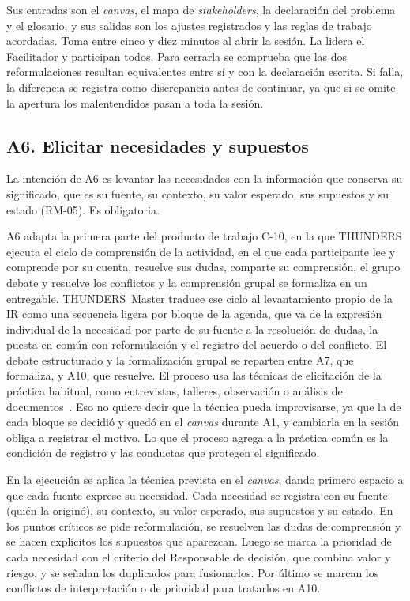 \documentclass[12pt,letterpaper,oneside]{report}
\begin{document}
Sus entradas son el \textit{canvas}, el mapa de \textit{stakeholders}, la
declaración del problema y el glosario, y sus salidas son los ajustes
registrados y las reglas de trabajo acordadas. Toma entre cinco y diez minutos al
abrir la sesión. La lidera el Facilitador y participan todos. Para cerrarla se
comprueba que las dos reformulaciones resultan equivalentes entre sí y con la
declaración escrita. Si falla, la diferencia se registra como discrepancia antes
de continuar, ya que si se omite la apertura los malentendidos pasan a toda la
sesión.

\subsection{A6. Elicitar necesidades y supuestos}
La intención de A6 es levantar las necesidades con la información que conserva
su significado, que es su fuente, su contexto, su valor esperado, sus
supuestos y su estado (RM-05). Es obligatoria.

A6 adapta la primera parte del producto de trabajo C-10, en la que THUNDERS ejecuta el
ciclo de comprensión de la actividad, en el que cada participante lee y
comprende por su cuenta, resuelve sus dudas, comparte su comprensión, el grupo debate y resuelve
los conflictos y la comprensión grupal se formaliza en un entregable.
THUNDERS~Master traduce ese ciclo al levantamiento propio de la IR como una
secuencia ligera por bloque de la agenda, que va de la expresión individual de
la necesidad por parte de su fuente a la resolución de dudas, la puesta en común
con reformulación y el registro del acuerdo o del conflicto. El debate
estructurado y la formalización grupal se reparten entre A7, que formaliza, y
A10, que resuelve. El proceso usa las técnicas de elicitación de la
práctica habitual, como entrevistas, talleres, observación o
análisis de documentos~\cite{lim2021data}. Eso no quiere decir que la técnica
pueda improvisarse, ya que la de cada bloque se decidió y quedó en el
\textit{canvas} durante A1, y cambiarla en la sesión obliga a registrar el
motivo. Lo que el proceso agrega a la práctica común es la condición de
registro y las conductas que protegen el significado.

En la ejecución se aplica la técnica prevista en el \textit{canvas}, dando
primero espacio a que cada fuente exprese su necesidad. Cada necesidad se
registra con su fuente (quién la originó), su contexto, su valor esperado, sus
supuestos y su estado. En los puntos críticos se pide reformulación, se
resuelven las dudas de comprensión y se hacen explícitos los supuestos que
aparezcan. Luego se marca la prioridad de cada necesidad con el criterio del
Responsable de decisión, que combina valor y riesgo, y se señalan los
duplicados para fusionarlos. Por último se marcan los conflictos de
interpretación o de prioridad para tratarlos en A10.
\end{document}
